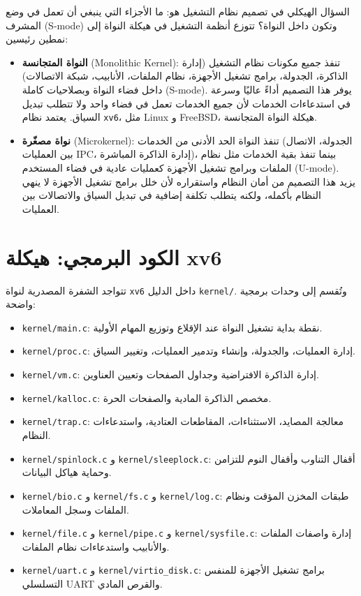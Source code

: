 السؤال الهيكلي في تصميم نظام التشغيل هو: ما الأجزاء التي ينبغي أن تعمل في وضع المشرف (S-mode) وتكون داخل النواة؟
تتوزع أنظمة التشغيل في هيكلة النواة إلى نمطين رئيسين:
\begin{itemize}
  \item \textbf{النواة المتجانسة} (Monolithic Kernel): تنفذ جميع مكونات نظام التشغيل (إدارة الذاكرة، الجدولة، برامج تشغيل الأجهزة، نظام الملفات، الأنابيب، شبكة الاتصالات) داخل فضاء النواة وبصلاحيات كاملة (S-mode). يوفر هذا التصميم أداءً عاليًا وسرعة في استدعاءات الخدمات لأن جميع الخدمات تعمل في فضاء واحد ولا تتطلب تبديل السياق. يعتمد نظام \texttt{xv6}، مثل Linux و FreeBSD، هيكلة النواة المتجانسة.
  \item \textbf{نواة مصغّرة} (Microkernel): تنفذ النواة الحد الأدنى من الخدمات (الجدولة، الاتصال بين العمليات IPC، إدارة الذاكرة المباشرة)، بينما تنفذ بقية الخدمات مثل نظام الملفات وبرامج تشغيل الأجهزة كعمليات عادية في فضاء المستخدم (U-mode). يزيد هذا التصميم من أمان النظام واستقراره لأن خلل برامج تشغيل الأجهزة لا ينهي النظام بأكمله، ولكنه يتطلب تكلفة إضافية في تبديل السياق والاتصالات بين العمليات.
\end{itemize}

\section{الكود البرمجي: هيكلة xv6}
\label{sec:code_xv6_org}

تتواجد الشفرة المصدرية لنواة \texttt{xv6} داخل الدليل \texttt{kernel/}.
وتُقسم إلى وحدات برمجية واضحة:
\begin{itemize}
  \item \texttt{kernel/main.c}: نقطة بداية تشغيل النواة عند الإقلاع وتوزيع المهام الأولية.
  \item \texttt{kernel/proc.c}: إدارة العمليات، والجدولة، وإنشاء وتدمير العمليات، وتغيير السياق.
  \item \texttt{kernel/vm.c}: إدارة الذاكرة الافتراضية وجداول الصفحات وتعيين العناوين.
  \item \texttt{kernel/kalloc.c}: مخصص الذاكرة المادية والصفحات الحرة.
  \item \texttt{kernel/trap.c}: معالجة المصايد، الاستثناءات، المقاطعات العتادية، واستدعاءات النظام.
  \item \texttt{kernel/spinlock.c} و \texttt{kernel/sleeplock.c}: أقفال التناوب وأقفال النوم للتزامن وحماية هياكل البيانات.
  \item \texttt{kernel/bio.c} و \texttt{kernel/fs.c} و \texttt{kernel/log.c}: طبقات المخزن المؤقت ونظام الملفات وسجل المعاملات.
  \item \texttt{kernel/file.c} و \texttt{kernel/pipe.c} و \texttt{kernel/sysfile.c}: إدارة واصفات الملفات والأنابيب واستدعاءات نظام الملفات.
  \item \texttt{kernel/uart.c} و \texttt{kernel/virtio\_disk.c}: برامج تشغيل الأجهزة للمنفس التسلسلي UART والقرص المادي.
\end{itemize}

